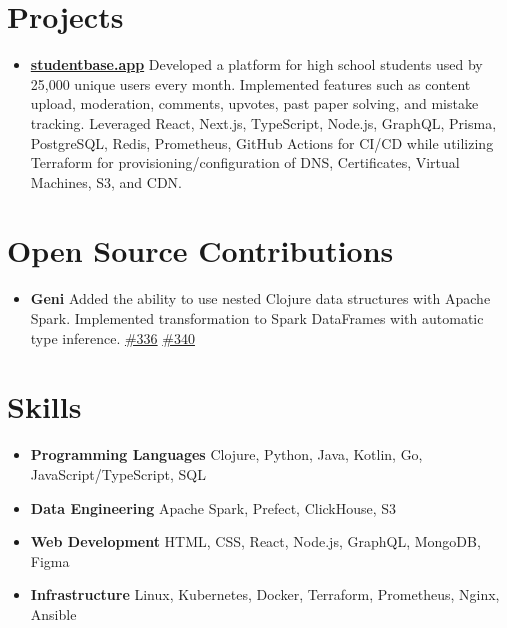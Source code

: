 \documentclass[letterpaper,11pt]{article}
\newcommand{\resumeItem}[2]{
  \item\small{
    \textbf{#1}{ #2 \vspace{-2pt}}
  }
}
\newcommand{\resumeSubItem}[2]{\resumeItem{#1}{#2}\vspace{-4pt}}
\newcommand{\resumeSubHeadingListStart}{\begin{itemize}[leftmargin=*]}
\newcommand{\resumeSubHeadingListEnd}{\end{itemize}}
\begin{document}
\section{Projects}
  \resumeSubHeadingListStart
    \resumeSubItem{\href{https://studentbase.app}{studentbase.app}}
      {Developed a platform for high school students used by 25,000 unique users every month. Implemented features such as content upload, moderation, comments, upvotes, past paper solving, and mistake tracking. Leveraged React, Next.js, TypeScript, Node.js, GraphQL, Prisma, PostgreSQL, Redis, Prometheus, GitHub Actions for CI/CD while utilizing Terraform for provisioning/configuration of DNS, Certificates, Virtual Machines, S3, and CDN.}
  \resumeSubHeadingListEnd

\section{Open Source Contributions}
  \resumeSubHeadingListStart
    \resumeSubItem{Geni}
      {Added the ability to use nested Clojure data structures with Apache Spark. Implemented transformation to Spark DataFrames with automatic type inference. \href{https://github.com/zero-one-group/geni/pull/336}{\#336} \href{https://github.com/zero-one-group/geni/pull/340}{\#340}}
  \resumeSubHeadingListEnd
  
\section{Skills}
 \resumeSubHeadingListStart
    \resumeSubItem{Programming Languages}
      {Clojure, Python, Java, Kotlin, Go, JavaScript/TypeScript, SQL}
    \resumeSubItem{Data Engineering}
      {Apache Spark, Prefect, ClickHouse, S3}
    \resumeSubItem{Web Development}
      {HTML, CSS, React, Node.js, GraphQL, MongoDB, Figma}
    \resumeSubItem{Infrastructure}
      {Linux, Kubernetes, Docker, Terraform, Prometheus, Nginx, Ansible}
 \resumeSubHeadingListEnd
\end{document}
